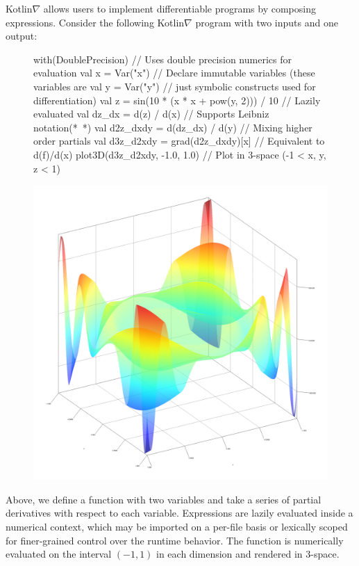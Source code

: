 \documentclass[12pt,initial,twoside,maitrise]{dms}
\numberwithin{equation}{section}
\numberwithin{table}{chapter}
\numberwithin{figure}{chapter}
\begin{document}
Kotlin$\nabla$ allows users to implement differentiable programs by composing expressions. Consider the following Kotlin$\nabla$ program with two inputs and one output:
%
\begin{figure}[H] \label{fig:basic_kotlingrad}
\begin{unbreakablekotlin}
with(DoublePrecision) { // Uses double precision numerics for evaluation
  val x = Var("x") // Declare immutable variables (these variables are
  val y = Var("y") // just symbolic constructs used for differentiation)
  val z = sin(10 * (x * x + pow(y, 2))) / 10 // Lazily evaluated
  val dz_dx = d(z) / d(x) // Supports Leibniz notation(*~\citep{christianson2012leibniz}*)
  val d2z_dxdy = d(dz_dx) / d(y) // Mixing higher order partials
  val d3z_d2xdy = grad(d2z_dxdy)[x] // Equivalent to d(f)/d(x)
  plot3D(d3z_d2xdy, -1.0, 1.0) // Plot in 3-space (-1 < x, y, z < 1)
}
\end{unbreakablekotlin}
\includegraphics[scale=0.43]{../figures/plot_result.png}
\end{figure}
%
Above, we define a function with two variables and take a series of partial derivatives with respect to each variable. Expressions are lazily evaluated inside a numerical context, which may be imported on a per-file basis or lexically scoped for finer-grained control over the runtime behavior. The function is numerically evaluated on the interval $(-1, 1)$ in each dimension and rendered in 3-space.
\end{document}
